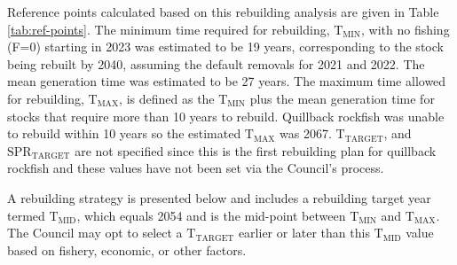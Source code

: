\documentclass[11pt,
  english,
  a4paper,
]{article}
\begin{document}
Reference points calculated based on this rebuilding analysis are given in Table \ref{tab:ref-points}. The minimum time required for rebuilding, {\(\text{T}_\text{MIN}\)\leavevmode\tagmcend\tagstructend}, with no fishing (F=0) starting in 2023 was estimated to be 19 years, corresponding to the stock being rebuilt by 2040, assuming the default removals for 2021 and 2022. The mean generation time was estimated to be 27 years. The maximum time allowed for rebuilding, {\(\text{T}_\text{MAX}\)\leavevmode\tagmcend\tagstructend}, is defined as the {\(\text{T}_\text{MIN}\)\leavevmode\tagmcend\tagstructend} plus the mean generation time for stocks that require more than 10 years to rebuild. Quillback rockfish was unable to rebuild within 10 years so the estimated {\(\text{T}_\text{MAX}\)\leavevmode\tagmcend\tagstructend} was 2067. {\(\text{T}_\text{TARGET}\)\leavevmode\tagmcend\tagstructend}, and {\(\text{SPR}_\text{TARGET}\)\leavevmode\tagmcend\tagstructend} are not specified since this is the first rebuilding plan for quillback rockfish and these values have not been set via the Council's process.

\leavevmode\tagmcend\tagstructend\par


A rebuilding strategy is presented below and includes a rebuilding target year termed {\(\text{T}_\text{MID}\)\leavevmode\tagmcend\tagstructend}, which equals 2054 and is the mid-point between {\(\text{T}_\text{MIN}\)\leavevmode\tagmcend\tagstructend} and {\(\text{T}_\text{MAX}\)\leavevmode\tagmcend\tagstructend}. The Council may opt to select a {\(\text{T}_\text{TARGET}\)\leavevmode\tagmcend\tagstructend} earlier or later than this {\(\text{T}_\text{MID}\)\leavevmode\tagmcend\tagstructend} value based on fishery, economic, or other factors.

\leavevmode\tagmcend\tagstructend\par
\end{document}
